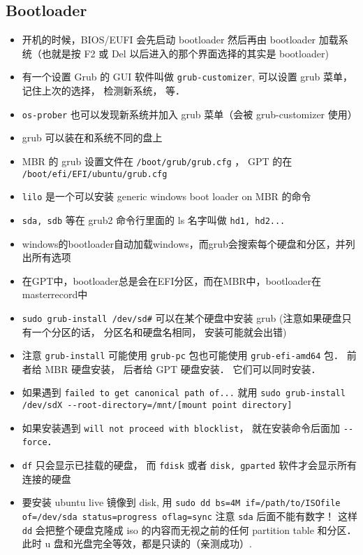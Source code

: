 \subsection{Bootloader}
\begin{itemize}
\item 开机的时候，BIOS/EUFI 会先启动 bootloader 然后再由 bootloader 加载系统（也就是按 F2 或 Del 以后进入的那个界面选择的其实是 bootloader)
\item 有一个设置 Grub 的 GUI 软件叫做 \verb|grub-customizer|, 可以设置 grub 菜单， 记住上次的选择， 检测新系统， 等．
\item \verb|os-prober| 也可以发现新系统并加入 grub 菜单（会被 grub-customizer 使用）
\item grub 可以装在和系统不同的盘上
\item MBR 的 grub 设置文件在 \verb|/boot/grub/grub.cfg| ， GPT 的在 \verb|/boot/efi/EFI/ubuntu/grub.cfg|
\item \verb|lilo| 是一个可以安装 generic windows boot loader on MBR 的命令
\item \verb|sda, sdb| 等在 grub2 命令行里面的 ls 名字叫做 \verb|hd1, hd2...|
\item windows的bootloader自动加载windows，而grub会搜索每个硬盘和分区，并列出所有选项
\item 在GPT中，bootloader总是会在EFI分区，而在MBR中，bootloader在masterrecord中
\item \verb|sudo grub-install /dev/sd#| 可以在某个硬盘中安装 grub (注意如果硬盘只有一个分区的话， 分区名和硬盘名相同， 安装可能就会出错)
\item 注意 \verb|grub-install| 可能使用 \verb|grub-pc| 包也可能使用 \verb|grub-efi-amd64| 包． 前者给 MBR 硬盘安装， 后者给 GPT 硬盘安装． 它们可以同时安装．
\item 如果遇到 \verb|failed to get canonical path of...| 就用 \verb|sudo grub-install /dev/sdX --root-directory=/mnt/[mount point directory]|
\item 如果安装遇到 \verb|will not proceed with blocklist|， 就在安装命令后面加 \verb|--force|．
\item \verb|df| 只会显示已挂载的硬盘， 而 \verb|fdisk| 或者 \verb|disk, gparted| 软件才会显示所有连接的硬盘
\item 要安装 ubuntu live 镜像到 disk, 用 \verb|sudo dd bs=4M if=/path/to/ISOfile of=/dev/sda status=progress oflag=sync| 注意 \verb|sda| 后面不能有数字！ 这样 \verb|dd| 会把整个硬盘克隆成 iso 的内容而无视之前的任何 partition table 和分区． 此时 u 盘和光盘完全等效，都是只读的（亲测成功）.
\end{itemize}

